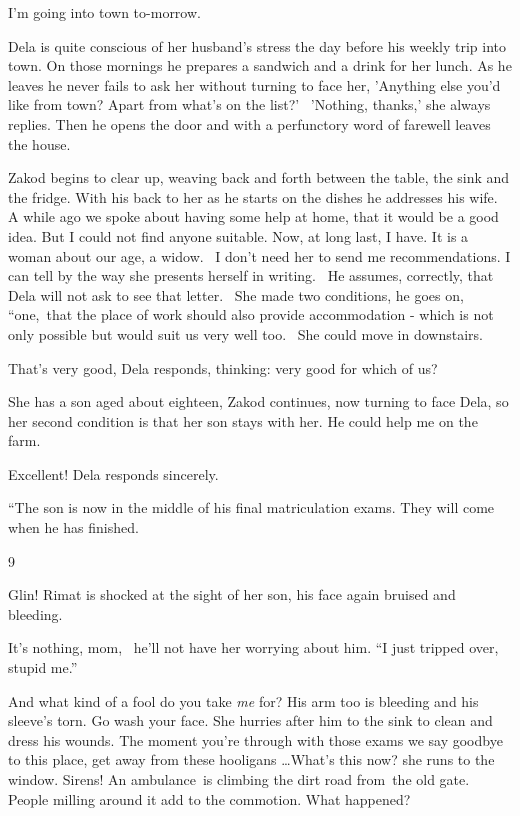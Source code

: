 \documentclass[letterpaper]{article}
\begin{document}
{\textquotedbl}I'm going into town to-morrow{\textquotedbl}. 

Dela is quite conscious of her husband's stress the day before his weekly trip into town. On those mornings he prepares
a sandwich and a drink for her lunch. As he leaves he never fails to ask her without turning to face her, 'Anything
else you'd like from town? Apart from what's on the list?' \ {}'Nothing, thanks,' she always replies. Then he opens the
door and with a perfunctory word of farewell leaves the house. 

Zakod begins to clear up, weaving back and forth between the table, the sink and the fridge. With his back to her as he
starts on the dishes he addresses his wife. {\textquotedbl}A while ago we spoke about having some help at home, that it
would be a good idea. But I could not find anyone suitable. Now, at long last, I have. It is a woman about our age, a
widow.~ I don't need her to send me recommendations. I can tell by the way she presents herself in
writing.{\textquotedbl} \ He assumes, correctly, that Dela will not ask to see that letter. \ {\textquotedbl}She made
two conditions,{\textquotedbl} he goes on, ``one,~that the place of work should also provide accommodation - which is
not only possible but would suit us very well too.~ She could move in downstairs.{\textquotedbl} 

{\textquotedbl}That's very good,{\textquotedbl} Dela responds, thinking: very good for which of us? 

{\textquotedbl}She has a son aged about eighteen,{\textquotedbl} Zakod continues, now turning to face Dela,
{\textquotedbl}so her second condition is that her son stays with her. He could help me on the farm.{\textquotedbl} 

{\textquotedbl}Excellent!{\textquotedbl} Dela responds sincerely.

{}``The son is now in the middle of his final matriculation exams. They will come when he has finished.{\textquotedbl}


\bigskip

9

{\textquotedbl}Glin!{\textquotedbl} Rimat is shocked at the sight of her son, his face again bruised and bleeding.

{\textquotedbl}It's nothing, mom,{\textquotedbl} \ he'll not have her worrying about him. ``I just tripped over, stupid
me.'' 

{\textquotedbl}And what kind of a fool do you take \textit{me} for?{\textquotedbl} His arm too is bleeding and his
sleeve's torn. {\textquotedbl}Go wash your face.{\textquotedbl} She hurries after him to the sink to clean and dress
his wounds. {\textquotedbl}The moment you're through with those exams we say goodbye to this place, get away from these
hooligans {\dots}What's this now?{\textquotedbl} she runs to the window. Sirens! An ambulance~is climbing the dirt road
from~the old gate. People milling around it add to the commotion. {\textquotedbl}What happened?{\textquotedbl} 
\end{document}
